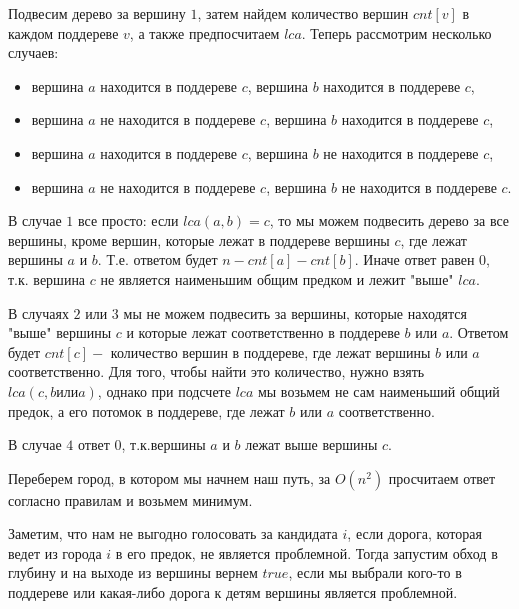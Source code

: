 \documentclass[12pt]{article}
\begin{document}

Подвесим дерево за вершину $1$, затем найдем количество вершин $cnt[v]$ в каждом поддереве $v$, а также предпосчитаем $lca$.
Теперь рассмотрим несколько случаев:
\begin{itemize}
	\item вершина $a$ находится в поддереве $c$, вершина $b$ находится в поддереве $c$,
	\item вершина $a$ не находится в поддереве $c$, вершина $b$ находится в поддереве $c$,
	\item вершина $a$ находится в поддереве $c$, вершина $b$ не находится в поддереве $c$,
	\item вершина $a$ не находится в поддереве $c$, вершина $b$ не находится в поддереве $c$.
\end{itemize}

В случае $1$ все просто: если $lca(a, b) = c$, то мы можем подвесить дерево за все
вершины, кроме вершин, которые лежат в поддереве вершины $c$, где лежат вершины $a$ и $b$.
Т.е. ответом будет $n - cnt[a] - cnt[b]$.
Иначе ответ равен $0$, т.к. вершина $c$ не является наименьшим общим предком и лежит "выше" $lca$.

В случаях $2$ или $3$ мы не можем подвесить за вершины, которые находятся "выше" вершины $c$ и которые лежат соответственно в поддереве $b$ или $a$.
Ответом будет $cnt[c] -$ количество вершин в поддереве, где лежат вершины $b$ или $a$ соответственно. Для того, чтобы найти это количество, нужно
взять $lca(c, b или a)$, однако при подсчете $lca$ мы возьмем не сам наименьший общий предок, а его потомок в поддереве, где лежат $b$ или $a$ соответственно.

В случае $4$ ответ $0$, т.к.вершины $a$ и $b$ лежат выше вершины $c$.

\EndEditorial
{}

Переберем город, в котором мы начнем наш путь, за $O(n^2)$ просчитаем ответ согласно правилам и возьмем минимум.
\EndEditorial
{}

Заметим, что нам не выгодно голосовать за кандидата $i$, если дорога, которая ведет из города $i$ в его предок, не является проблемной.
Тогда запустим обход в глубину и на выходе из вершины вернем $true$, если мы выбрали кого-то в поддереве или какая-либо дорога к детям вершины является проблемной.

\EndEditorial
\end{document}
